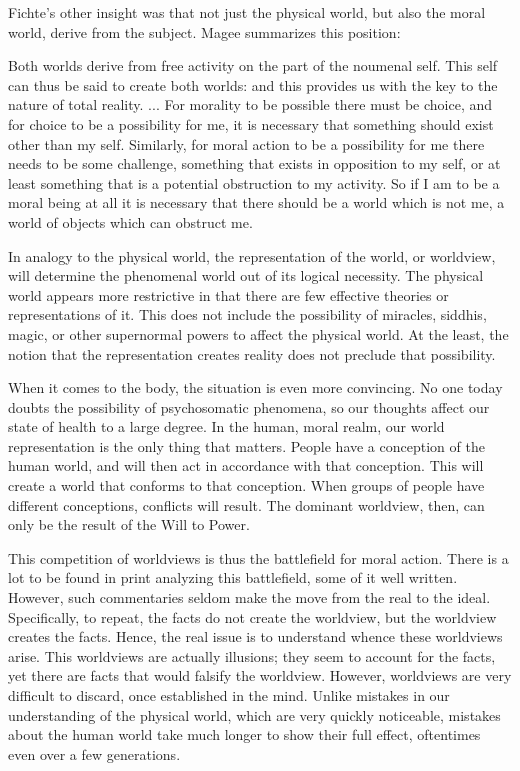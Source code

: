 Fichte's other insight was that not just the physical world, but also the moral world, derive from the subject. Magee summarizes this position:

\begin{quotex}
Both worlds derive from free activity on the part of the noumenal self. This self can thus be said to create both worlds: and this provides us with the key to the nature of total reality. ... For morality to be possible there must be choice, and for choice to be a possibility for me, it is necessary that something should exist other than my self. Similarly, for moral action to be a possibility for me there needs to be some challenge, something that exists in opposition to my self, or at least something that is a potential obstruction to my activity. So if I am to be a moral being at all it is necessary that there should be a world which is not me, a world of objects which can obstruct me.
\end{quotex}


In analogy to the physical world, the representation of the world, or worldview, will determine the phenomenal world out of its logical necessity. The physical world appears more restrictive in that there are few effective theories or representations of it. This does not include the possibility of miracles, siddhis, magic, or other supernormal powers to affect the physical world. At the least, the notion that the representation creates reality does not preclude that possibility.

When it comes to the body, the situation is even more convincing. No one today doubts the possibility of psychosomatic phenomena, so our thoughts affect our state of health to a large degree. In the human, moral realm, our world representation is the only thing that matters. People have a conception of the human world, and will then act in accordance with that conception. This will create a world that conforms to that conception. When groups of people have different conceptions, conflicts will result. The dominant worldview, then, can only be the result of the Will to Power.

This competition of worldviews is thus the battlefield for moral action. There is a lot to be found in print analyzing this battlefield, some of it well written. However, such commentaries seldom make the move from the real to the ideal. Specifically, to repeat, the facts do not create the worldview, but the worldview creates the facts. Hence, the real issue is to understand whence these worldviews arise. This worldviews are actually illusions; they seem to account for the facts, yet there are facts that would falsify the worldview. However, worldviews are very difficult to discard, once established in the mind. Unlike mistakes in our understanding of the physical world, which are very quickly noticeable, mistakes about the human world take much longer to show their full effect, oftentimes even over a few generations.


